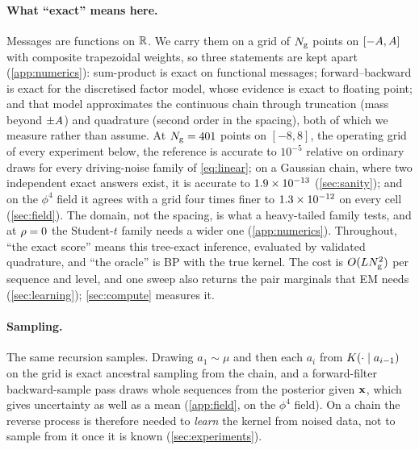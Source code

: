 \paragraph{What ``exact'' means here.}
Messages are functions on $\mathbb{R}$. We carry them on a grid of $N_{\mathrm{g}}$ points on
$[-A,A]$ with composite trapezoidal weights, so three statements are kept
apart (\cref{app:numerics}): sum-product is exact on functional messages; forward--backward is exact
for the discretised factor model, whose evidence is exact to floating point; and that model
approximates the continuous chain through truncation (mass beyond $\pm A$) and quadrature
(second order in the spacing), both of which we measure rather than assume. At $N_{\mathrm{g}}=401$ points
on $[-8,8]$, the operating grid of every experiment below, the reference is accurate to
$10^{-5}$ relative on ordinary draws for every driving-noise family of
\cref{eq:linear}; on a Gaussian chain, where two independent exact answers exist, it is accurate to
$1.9\times10^{-13}$ (\cref{sec:sanity}); and on the $\phi^4$ field it agrees with a grid four times finer to
$1.3\times10^{-12}$ on every cell (\cref{sec:field}). The domain, not the spacing, is what a
heavy-tailed family tests, and at $\rho=0$ the Student-$t$ family needs a wider one
(\cref{app:numerics}). Throughout, ``the exact score'' means this tree-exact inference, evaluated by
validated quadrature, and ``the oracle'' is BP with the true kernel. The cost is $O(LN_{\mathrm{g}}^2)$
per sequence and level, and one sweep also returns the pair marginals that EM needs
(\cref{sec:learning}); \cref{sec:compute} measures it.

\paragraph{Sampling.}
The same recursion samples. Drawing $a_1\sim\mu$ and then each $a_i$ from $K(\cdot\mid a_{i-1})$
on the grid is exact ancestral sampling from the chain, and a forward-filter backward-sample pass
draws whole sequences from the posterior given $\mathbf{x}$, which gives uncertainty as well as a mean
(\cref{app:field}, on the $\phi^4$ field). On a chain the reverse process is therefore needed to \emph{learn} the
kernel from noised data, not to sample from it once it is known (\cref{sec:experiments}).
